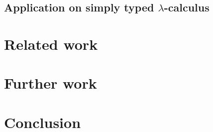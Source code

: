 \documentclass{article}
\newcommand{\remtext}[1]{}
\begin{document}
\subsection{Application on simply typed $\lambda$-calculus}

\section{Related work}

\remtext{Dolphin, Twelf, etc}

\remtext{Semantic patches à la coccinnelle}

\section{Further work}

\remtext{Extension vers une version constructiviste?}

\remtext{Algorithme d'élaboration de patchs?}

\remtext{Parler du bootstraping?}

\section{Conclusion}








\end{document}
